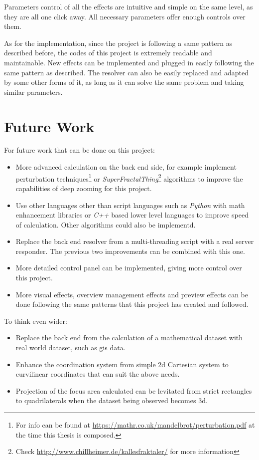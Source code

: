 Parameters control of all the effects are intuitive and simple on the same level, as they are all one click away. All necessary parameters offer enough controls over them. 

As for the implementation, since the project is following a same pattern as described before, the codes of this project is extremely readable and maintainable. New effects can be implemented and plugged in easily following the same pattern as described. The resolver can also be easily replaced and adapted by some other forms of it, as long as it can solve the same problem and taking similar parameters.


\section{Future Work}

For future work that can be done on this project:

\begin{itemize}
    \item More advanced calculation on the back end side, for example implement perturbation techniques\footnote{ For info can be found at \url{https://mathr.co.uk/mandelbrot/perturbation.pdf} at the time this thesis is composed.} or \emph{SuperFractalThing}\footnote{ Check \url{http://www.chillheimer.de/kallesfraktaler/} for more information} algorithms to improve the capabilities of deep zooming for this project.
    \item Use other languages other than script languages such as \emph{Python} with math enhancement libraries or \emph{C++} based lower level languages to improve speed of calculation. Other algorithms could also be implementd.
    \item Replace the back end resolver from a multi-threading script with a real server responder. The previous two improvements can be combined with this one.
    \item More detailed control panel can be implemented, giving more control over this project.
    \item More visual effects, overview management effects and preview effects can be done following the same patterns that this project has created and followed.
\end{itemize}

To think even wider:

\begin{itemize}
    \item Replace the back end from the calculation of a mathematical dataset with real world dataset, such as \gls{gis} data.
    \item Enhance the coordination system from simple 2d Cartesian system to curvilinear coordinates that can suit the above needs.
    \item Projection of the focus area calculated can be levitated from strict rectangles to quadrilaterals when the dataset being observed becomes 3d.
\end{itemize}